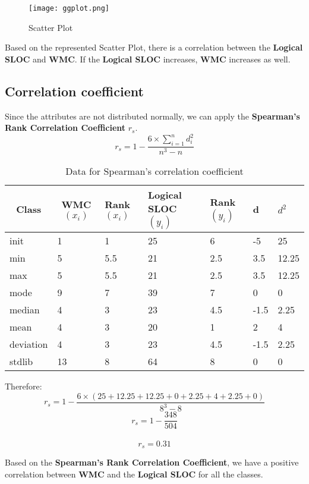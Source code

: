 \documentclass[12pt]{article}
\begin{document}
\begin{figure}[h]
\centering
\texttt{[image: ggplot.png]}
\caption{Scatter Plot}
\end{figure}
\par Based on the represented Scatter Plot, there is a correlation between the \textbf{Logical SLOC} and \textbf{WMC}. If the \textbf{Logical SLOC} increases, \textbf{WMC} increases as well.
\subsection{Correlation coefficient}
Since the attributes are not distributed normally, we can apply the \textbf{Spearman's Rank Correlation Coefficient} $r_{s}$.\cite{Correlation}
\begin{equation}
    r_{s} = 1-\frac{6\times\sum^{n}_{i=1}{d_{i}^2}}{n^3-n}  
\end{equation}

\begin{table}[h]
\centering
\begin{tabular}{|l|l|l|l|l|l|l|}
\hline
\multicolumn{1}{|c|}{\textbf{Class}} & \multicolumn{1}{c|}{\textbf{WMC$(x_{i})$}} & \textbf{Rank$(x_{i})$} & \textbf{Logical SLOC$(y_{i})$} & \textbf{Rank$(y_{i})$} & \textbf{d} & \textbf{$d^2$}\\ \hline
init      & 1  & 1   & 25 & 6   & -5 & 25\\ \hline
min       & 5  & 5.5 & 21 & 2.5 & 3.5 & 12.25\\ \hline
max       & 5  & 5.5 & 21 & 2.5 & 3.5 & 12.25\\ \hline
mode      & 9  & 7   & 39 & 7   & 0 & 0\\ \hline
median    & 4  & 3   & 23 & 4.5 & -1.5 & 2.25\\ \hline
mean      & 4  & 3   & 20 & 1   & 2 & 4\\ \hline
deviation & 4  & 3   & 23 & 4.5 &  -1.5 & 2.25\\ \hline
stdlib    & 13 & 8   & 64 & 8   &  0 & 0\\ \hline
\end{tabular}
\caption{Data for Spearman's correlation coefficient}
\end{table}
\par Therefore:
\begin{equation}
    r_{s} = 1-\frac{6\times(25+12.25+12.25+0+2.25+4+2.25+0)}{8^3-8}  
\end{equation}
\begin{equation}
    r_{s} = 1-\frac{348}{504}  
\end{equation}\\
\begin{equation}
    r_{s} = 0.31  
\end{equation}
\par Based on the \textbf{Spearman's Rank Correlation Coefficient}, we have a positive correlation between \textbf{WMC} and the \textbf{Logical SLOC} for all the classes.
\newpage
\end{document}
